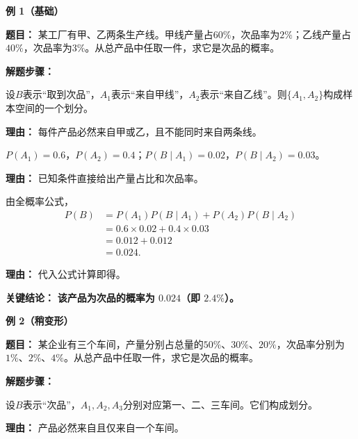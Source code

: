 \begin{examplebox}
	\textbf{\textcolor{CExample}{例 1（基础）}}

	\textbf{\textcolor{CExample}{题目：}}
	某工厂有甲、乙两条生产线。甲线产量占$60\%$，次品率为$2\%$；乙线产量占$40\%$，次品率为$3\%$。从总产品中任取一件，求它是次品的概率。

	\textbf{\textcolor{CExample}{解题步骤：}}
	\begin{description}[style=nextline, leftmargin=2.8em, labelsep=0.5em, itemsep=0.45em]
		\item[\textbf{第一步（设定事件）：}] 设$B$表示“取到次品”，$A_1$表示“来自甲线”，$A_2$表示“来自乙线”。则$\{A_1,A_2\}$构成样本空间的一个划分。
			\par\textbf{理由：} 每件产品必然来自甲或乙，且不能同时来自两条线。

		\item[\textbf{第二步（提取数据）：}] $P(A_1)=0.6$，$P(A_2)=0.4$；$P(B\mid A_1)=0.02$，$P(B\mid A_2)=0.03$。
			\par\textbf{理由：} 已知条件直接给出产量占比和次品率。

		\item[\textbf{第三步（套用公式）：}] 由全概率公式，
			\[
				\begin{aligned}
					P(B) &= P(A_1)P(B\mid A_1)+P(A_2)P(B\mid A_2) \\
					&= 0.6\times0.02+0.4\times0.03 \\
					&= 0.012+0.012 \\
					&= 0.024.
			\end{aligned}
			\]
			\par\textbf{理由：} 代入公式计算即得。
	\end{description}

	\textbf{\textcolor{CExample}{关键结论：}}
	\textbf{该产品为次品的概率为 $0.024$（即 $2.4\%$）。}

	\medskip
	\textbf{\textcolor{CExample}{例 2（稍变形）}}

	\textbf{\textcolor{CExample}{题目：}}
	某企业有三个车间，产量分别占总量的$50\%$、$30\%$、$20\%$，次品率分别为$1\%$、$2\%$、$4\%$。从总产品中任取一件，求它是次品的概率。

	\textbf{\textcolor{CExample}{解题步骤：}}
	\begin{description}[style=nextline, leftmargin=2.8em, labelsep=0.5em, itemsep=0.45em]
		\item[\textbf{第一步（设定事件）：}] 设$B$表示“次品”，$A_1,A_2,A_3$分别对应第一、二、三车间。它们构成划分。
			\par\textbf{理由：} 产品必然来自且仅来自一个车间。


\end{description}
\end{examplebox}
